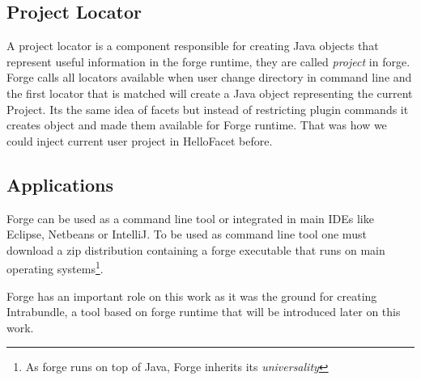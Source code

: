 \subsection{Project Locator}
\label{sec:forge:locator}
 A project locator is a component responsible for creating Java objects that represent useful information in the forge runtime, they are called \emph{project} in forge. Forge calls all locators available when user change directory in command line and the first locator that is matched will create a Java object representing the current Project. Its the same idea of facets but instead of restricting plugin commands it creates object and made them available for Forge runtime. That was how we could inject current user project in HelloFacet before.

\subsection{Applications}
Forge can be used as a command line tool or integrated in main IDEs like Eclipse, Netbeans or IntelliJ. To be used as command line tool one must download a zip distribution containing a forge executable that runs on main operating systems\footnote{As forge runs on top of Java, Forge inherits its \emph{universality}}.    

Forge has an important role on this work as it was the ground for creating Intrabundle, a tool based on forge runtime that will be introduced later on this work.